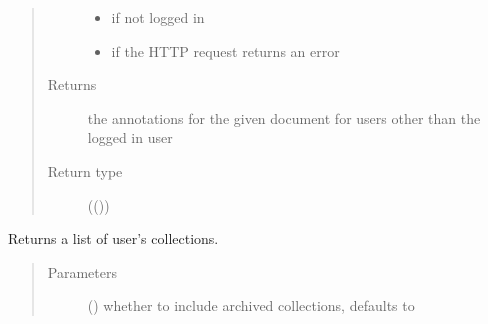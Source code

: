 \documentclass[letterpaper,10pt,english]{sphinxmanual}
\begin{document}
\begin{fulllineitems}
\begin{fulllineitems}
\begin{quote}
\begin{description}
\begin{itemize}
\item {} 
\sphinxAtStartPar
{\hyperref[\detokenize{autoapi/pine/client/exceptions/index:pine.client.exceptions.PineClientAuthException}]{}} \textendash{} if not logged in

\item {} 
\sphinxAtStartPar
{\hyperref[\detokenize{autoapi/pine/client/exceptions/index:pine.client.exceptions.PineClientHttpException}]{}} \textendash{} if the HTTP request returns an error

\end{itemize}

\item[{Returns}] \leavevmode
\sphinxAtStartPar
the annotations for the given document for users other than the logged in user

\item[{Return type}] \leavevmode
\sphinxAtStartPar
{}(())

\end{description}\end{quote}

\end{fulllineitems}


\begin{fulllineitems}
\label{\detokenize{autoapi/pine/client/client/index:pine.client.client.PineClient.list_collections}}
\sphinxAtStartPar
Returns a list of user’s collections.
\begin{quote}\begin{description}
\item[{Parameters}] \leavevmode
\sphinxAtStartPar
{} () \textendash{} whether to include archived collections, defaults to 


\end{description}
\end{quote}
\end{fulllineitems}
\end{fulllineitems}
\end{document}
